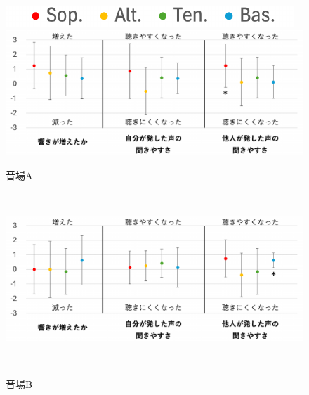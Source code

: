 \documentclass[11pt,a4j]{jreport}
\begin{document}
  \newpage
  \begin{figure}[H]
    \centering
    
    \begin{minipage}{1\linewidth}
      \centering
      \includegraphics[scale=.55]{images/subjectiveExp/statisticAnalysis/part_legend.pdf}
    \end{minipage}
    \vspace{.5\baselineskip}

    \begin{minipage}{1\linewidth}
      \centering
      \includegraphics[scale=.55]{images/subjectiveExp/statisticAnalysis/part_reverb_a.pdf}
      \caption*{音場A}
      \label{fig:響きの印象A}
    \end{minipage}
    \\
    \vspace{1\baselineskip}
    \begin{minipage}{1\linewidth}
      \centering
      \includegraphics[scale=.55]{images/subjectiveExp/statisticAnalysis/part_reverb_b.pdf}
      \caption*{音場B}
      \label{fig:響きの印象B}
    \end{minipage}
    \\
    \vspace{1\baselineskip}
    \begin{minipage}{1\linewidth}

\end{minipage}
\end{figure}
\end{document}
